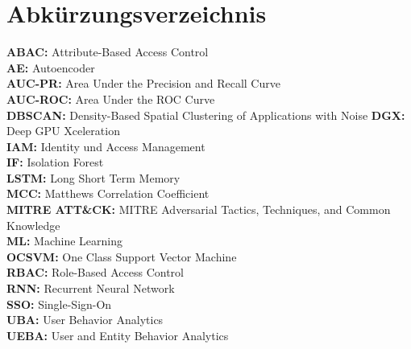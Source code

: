 \documentclass[a4paper,12pt]{article}
\begin{document}
	\section*{Abkürzungsverzeichnis}
	
	\textbf{ABAC:} Attribute-Based Access Control \\[1em]
	\textbf{AE:} Autoencoder \\[1em]
	\textbf{AUC-PR:} Area Under the Precision and Recall Curve \\[1em]
	\textbf{AUC-ROC:} Area Under the ROC Curve \\[1em]
	\textbf{DBSCAN:} Density-Based Spatial Clustering of Applications with Noise
	\textbf{DGX:} Deep GPU Xceleration \\[1em]
	\textbf{IAM:} Identity und Access Management \\[1em]
	\textbf{IF:} Isolation Forest \\[1em]
	\textbf{LSTM:} Long Short Term Memory \\[1em]
	\textbf{MCC:} Matthews Correlation Coefficient \\[1em]
	\textbf{MITRE ATT\&CK: } MITRE Adversarial Tactics, Techniques, 
		and Common Knowledge \\[1em]
	\textbf{ML:} Machine Learning \\[1em]
	\textbf{OCSVM:} One Class Support Vector Machine \\[1em]
	\textbf{RBAC:} Role-Based Access Control \\[1em]
	\textbf{RNN:} Recurrent Neural Network \\[1em]
	\textbf{SSO:} Single-Sign-On \\[1em]
	\textbf {UBA:} User Behavior Analytics \\[0.1em]
	\textbf {UEBA:} User and Entity Behavior Analytics \\[0.1em]
	
	\newpage
	
	
	
	
\end{document}

